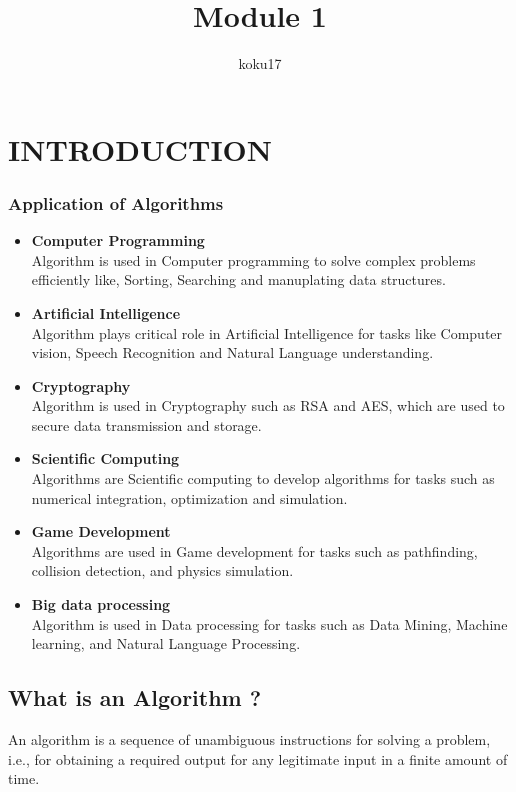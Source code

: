 \documentclass{article}
\author{koku17}
\title{Module 1}
\begin{document}
	\maketitle \thispagestyle{empty} \newpage
	\tableofcontents \thispagestyle{empty} \newpage \setcounter{page}{1}
	\section{INTRODUCTION}
	

	\subsubsection*{Application of Algorithms}
	\begin{itemize}
		\item \textbf{Computer Programming} \\
			Algorithm is used in Computer programming to solve complex problems efficiently like, Sorting,
			Searching and manuplating data structures.
		\item \textbf{Artificial Intelligence} \\
			Algorithm plays critical role in Artificial Intelligence for tasks like Computer vision,
			Speech Recognition and Natural Language understanding.
		\item \textbf{Cryptography} \\
			Algorithm is used in Cryptography such as RSA and AES, which are used to secure data transmission
			and storage.
		\item \textbf{Scientific Computing} \\
			Algorithms are Scientific computing to develop algorithms for tasks such as numerical integration,
			optimization and simulation.
		\item \textbf{Game Development} \\
			Algorithms are used in Game development for tasks such as pathfinding, collision detection, and
			physics simulation.
		\item \textbf{Big data processing} \\
			Algorithm is used in Data processing for tasks such as Data Mining, Machine learning, and
			Natural Language Processing.
	\end{itemize}

	\subsection{What is an Algorithm ?}
	An algorithm is a sequence of unambiguous instructions for solving a problem, i.e., for obtaining a required
	output for any legitimate input in a finite amount of time.
\end{document}
